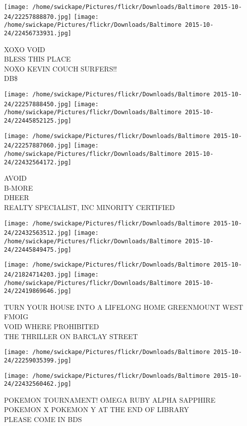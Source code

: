 \documentclass[10pt,letterpaper]{article}
\begin{document}
\texttt{[image: /home/swickape/Pictures/flickr/Downloads/Baltimore 2015-10-24/22257888870.jpg]}
\texttt{[image: /home/swickape/Pictures/flickr/Downloads/Baltimore 2015-10-24/22456733931.jpg]}

XOXO VOID\\
BLESS THIS PLACE\\
NOXO KEVIN COUCH SURFERS!!\\
DB\$
\pagebreak

\texttt{[image: /home/swickape/Pictures/flickr/Downloads/Baltimore 2015-10-24/22257888450.jpg]}
\texttt{[image: /home/swickape/Pictures/flickr/Downloads/Baltimore 2015-10-24/22445852125.jpg]}

\texttt{[image: /home/swickape/Pictures/flickr/Downloads/Baltimore 2015-10-24/22257887060.jpg]}
\texttt{[image: /home/swickape/Pictures/flickr/Downloads/Baltimore 2015-10-24/22432564172.jpg]}

AVOID\\
B{-}MORE\\
DHEER\\
REALTY SPECIALIST, INC MINORITY CERTIFIED
\pagebreak

\texttt{[image: /home/swickape/Pictures/flickr/Downloads/Baltimore 2015-10-24/22432563512.jpg]}
\texttt{[image: /home/swickape/Pictures/flickr/Downloads/Baltimore 2015-10-24/22445849475.jpg]}

\texttt{[image: /home/swickape/Pictures/flickr/Downloads/Baltimore 2015-10-24/21824714203.jpg]}
\texttt{[image: /home/swickape/Pictures/flickr/Downloads/Baltimore 2015-10-24/22419869646.jpg]}

TURN YOUR HOUSE INTO A LIFELONG HOME GREENMOUNT WEST\\
FMOIG\\
VOID WHERE PROHIBITED\\
THE THRILLER ON BARCLAY STREET
\pagebreak

\texttt{[image: /home/swickape/Pictures/flickr/Downloads/Baltimore 2015-10-24/22259035399.jpg]}

\vspace{0.25in}
\texttt{[image: /home/swickape/Pictures/flickr/Downloads/Baltimore 2015-10-24/22432560462.jpg]}

POKEMON TOURNAMENT!  OMEGA RUBY ALPHA SAPPHIRE POKEMON X POKEMON Y AT THE END OF LIBRARY\\
PLEASE COME IN BDS
\pagebreak
\end{document}
